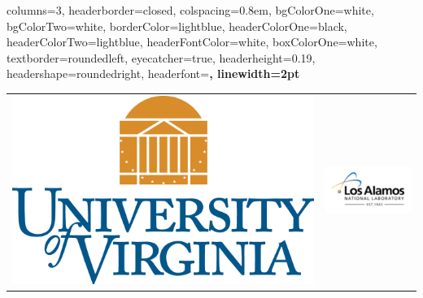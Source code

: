 \documentclass[landscape,a0paper,fontscale=0.285]{baposter} %
\begin{document}
\begin{poster}
{
columns=3,  %
headerborder=closed, %
colspacing=0.8em, %
bgColorOne=white, %
bgColorTwo=white, %
borderColor=lightblue, %
headerColorOne=black, %
headerColorTwo=lightblue, %
headerFontColor=white, %
boxColorOne=white, %
textborder=roundedleft, %
eyecatcher=true, %
headerheight=0.19\textheight, %
headershape=roundedright, %
headerfont=\Large\bf\textsc, %
linewidth=2pt %
}
%
{ 
\begin{tabular}{c c}
\includegraphics[scale=0.1]{logos/uva_logo.png} & \includegraphics[scale=0.2]{logos/losA.png} \\

\end{tabular}}
\end{poster}
\end{document}
